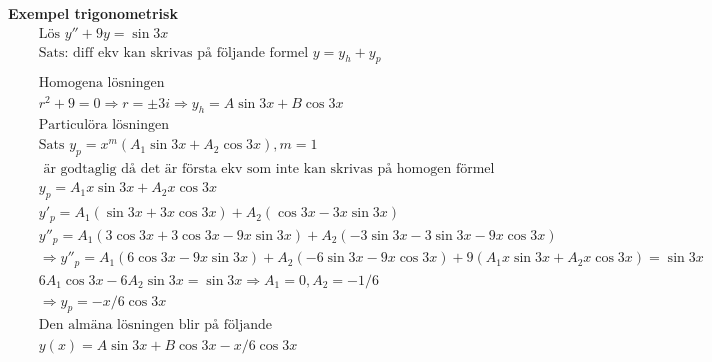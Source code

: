 \documentclass{article}
\begin{document}
\textbf{Exempel trigonometrisk}
\begin{align*} %
  &\quad  \text{Lös } y'' + 9y = \sin{3x}  \\
  &\quad  \text{Sats: diff ekv kan skrivas på följande formel } y=y_h+y_p \\
  &\quad  \\
  &\quad  \text{Homogena lösningen } \\
  &\quad  r^2+9=0 \Rightarrow r=\pm3i \Rightarrow y_h=A\sin{3x} + B\cos{3x}
  &\quad  \\
  &\quad  \text{Particulöra lösningen } \\
  &\quad  \text{Sats } y_p=x^m(A_1\sin{3x}+A_2\cos{3x}), m=1 \\
  &\quad  \text{ är godtaglig då det är första ekv som inte kan skrivas på homogen förmel} \\
  &\quad  y_p=A_1x\sin{3x}+A_2x\cos{3x} \\
  &\quad  y'_p=A_1(\sin{3x}+3x\cos{3x}) + A_2(\cos{3x}-3x\sin{3x}) \\
  &\quad  y''_p=A_1(3\cos{3x}+3\cos{3x}-9x\sin{3x}) + A_2(-3\sin{3x}-3\sin{3x}-9x\cos{3x}) \\
  &\quad  \Rightarrow y''_p=A_1(6\cos{3x}-9x\sin{3x}) + A_2(-6\sin{3x}-9x\cos{3x})
  + 9(A_1x\sin{3x}+A_2x\cos{3x}) = \sin{3x} \\
  &\quad  6A_1\cos{3x} - 6A_2\sin{3x} = \sin{3x} \Rightarrow A_1=0, A_2=-1/6 \\
  &\quad  \Rightarrow y_p = -x/6 \cos{3x}
  &\quad  \\
  &\quad  \text{Den almäna lösningen blir på följande } \\
  &\quad  y(x)= A\sin{3x}+B\cos{3x} -x/6 \cos{3x} \\
\end{align*}
\end{document}
